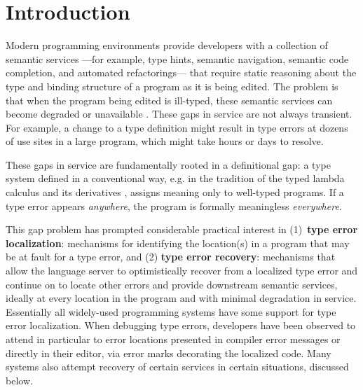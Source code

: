 \section{Introduction}
\label{sec:introduction}


Modern programming environments provide developers with a collection of semantic services%
---for example, type hints, semantic navigation, semantic code completion, and automated refactorings---%
that require static reasoning about the type and binding structure of a program as it is being edited. 
The problem is that when the program being edited is ill-typed, 
these semantic services can become degraded or unavailable \cite{HazelnutSNAPL}. 
These gaps in service are not always transient. 
For example, a change to a type definition might result in type errors at dozens of use sites in a large program, which might take hours or days to resolve.

These gaps in service are fundamentally rooted in a definitional gap: a type system defined in a conventional way, 
e.g. in the tradition of the typed lambda calculus and its derivatives \cite{TaplBook,pfpl},
assigns meaning only to well-typed programs. 
If a type error appears \emph{anywhere}, the program is formally meaningless \emph{everywhere}.

This gap problem has prompted considerable practical interest in 
(1)~\textbf{type error localization}: mechanisms for identifying the location(s) in a program that may be at fault for a type error, and 
(2) \textbf{type error recovery}: mechanisms that allow the language server to optimistically recover from a localized type error 
and continue on to locate other errors and provide downstream semantic services, 
ideally at every location in the program and with minimal degradation in service.
Essentially all widely-used programming systems have some support for type error localization. 
When debugging type errors, developers have been observed to attend in particular to error locations presented in compiler error messages 
or directly in their editor, via error marks decorating the localized code.
Many systems also attempt recovery of certain services in certain situations, discussed below.

